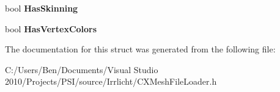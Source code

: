 \begin{DoxyCompactItemize}
\item 
\hypertarget{structirr_1_1scene_1_1_c_x_mesh_file_loader_1_1_s_x_mesh_aa382b54020c3c6f8214bec1ba9796c5b}{bool {\bfseries Has\-Skinning}}\label{structirr_1_1scene_1_1_c_x_mesh_file_loader_1_1_s_x_mesh_aa382b54020c3c6f8214bec1ba9796c5b}

\item 
\hypertarget{structirr_1_1scene_1_1_c_x_mesh_file_loader_1_1_s_x_mesh_aac8e66049b25268d6313cf3e1cc919e6}{bool {\bfseries Has\-Vertex\-Colors}}\label{structirr_1_1scene_1_1_c_x_mesh_file_loader_1_1_s_x_mesh_aac8e66049b25268d6313cf3e1cc919e6}

\end{DoxyCompactItemize}


The documentation for this struct was generated from the following file\-:\begin{DoxyCompactItemize}
\item 
C\-:/\-Users/\-Ben/\-Documents/\-Visual Studio 2010/\-Projects/\-P\-S\-I/source/\-Irrlicht/C\-X\-Mesh\-File\-Loader.\-h\end{DoxyCompactItemize}
